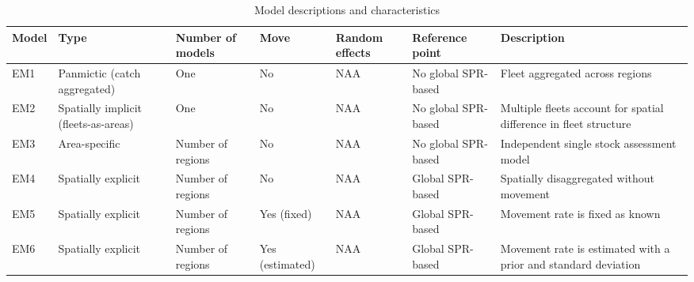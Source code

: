 
\begin{table}[h!]
\centering
\caption{Model descriptions and characteristics}
\label{model_table}
\begin{tabular}{|p{2cm}|p{3cm}|p{2cm}|p{2cm}|p{2cm}|p{2.5cm}|p{5cm}|}
\hline
\textbf{Model} & \textbf{Type} & \textbf{Number of models} & \textbf{Move} & \textbf{Random effects} & \textbf{Reference point} & \textbf{Description} \\
\hline
EM1 & Panmictic (catch aggregated) & One & No & NAA & No global SPR-based & Fleet aggregated across regions \\
\hline
EM2 & Spatially implicit (fleets-as-areas) & One & No & NAA & No global SPR-based & Multiple fleets account for spatial difference in fleet structure \\
\hline
EM3 & Area-specific & Number of regions & No & NAA & No global SPR-based & Independent single stock assessment model \\
\hline
EM4 & Spatially explicit & Number of regions & No & NAA & Global SPR-based & Spatially disaggregated without movement \\
\hline
EM5 & Spatially explicit & Number of regions & Yes (fixed) & NAA & Global SPR-based & Movement rate is fixed as known \\
\hline
EM6 & Spatially explicit & Number of regions & Yes (estimated) & NAA & Global SPR-based & Movement rate is estimated with a prior and standard deviation \\
\hline
\end{tabular}
\end{table}

